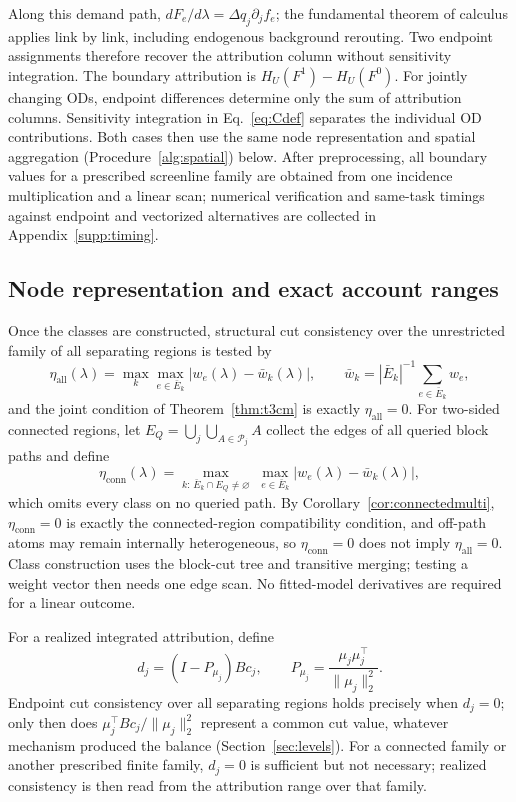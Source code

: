 \documentclass[a4paper,fleqn]{cas-sc}
\newcommand{\norm}[1]{\lVert #1 \rVert}
\begin{document}
Along this demand path, $dF_e/d\lambda=\Delta q_j\partial_jf_e$; the fundamental theorem of calculus applies link by link, including endogenous background rerouting. Two endpoint assignments therefore recover the attribution column without sensitivity integration. The boundary attribution is $H_U(F^1)-H_U(F^0)$.
For jointly changing ODs, endpoint differences determine only the sum of attribution columns. Sensitivity integration in Eq.~\eqref{eq:Cdef} separates the individual OD contributions. Both cases then use the same node representation and spatial aggregation (Procedure~\ref{alg:spatial}) below. After preprocessing, all boundary values for a prescribed screenline family are obtained from one incidence multiplication and a linear scan; numerical verification and same-task timings against endpoint and vectorized alternatives are collected in Appendix~\ref{supp:timing}.
\subsection{Node representation and exact account ranges}
Once the classes are constructed, structural cut consistency over the
unrestricted family of all separating regions is tested by
\begin{equation}
\eta_{\mathrm{all}}(\lambda)=\max_k\max_{e\in\bar E_k}|w_e(\lambda)-\bar w_k(\lambda)|,
\qquad
\bar w_k=|\bar E_k|^{-1}\sum_{e\in\bar E_k}w_e,
\label{eq:etaall}
\end{equation}
and the joint condition of Theorem~\ref{thm:t3cm} is exactly
$\eta_{\mathrm{all}}=0$. For two-sided connected regions, let
$E_Q=\bigcup_j\bigcup_{A\in\mathcal P_j}A$ collect the edges of all queried
block paths and define
\begin{equation}
\eta_{\mathrm{conn}}(\lambda)=
\max_{k:\,\bar E_k\cap E_Q\neq\varnothing}\;
\max_{e\in\bar E_k}|w_e(\lambda)-\bar w_k(\lambda)|,
\label{eq:etaconn}
\end{equation}
which omits every class on no queried path. By
Corollary~\ref{cor:connectedmulti}, $\eta_{\mathrm{conn}}=0$ is exactly the
connected-region compatibility condition, and off-path atoms may remain
internally heterogeneous, so $\eta_{\mathrm{conn}}=0$ does not imply
$\eta_{\mathrm{all}}=0$. Class construction uses the
block-cut tree and transitive merging; testing a weight vector then needs
one edge scan. No fitted-model derivatives are required for a linear outcome.

For a realized integrated attribution, define
\begin{equation}
d_j=(I-P_{\mu_j})Bc_j,\qquad
P_{\mu_j}=\frac{\mu_j\mu_j^\top}{\norm{\mu_j}_2^2}.
\label{eq:endpointd}
\end{equation}
Endpoint cut consistency over all separating regions holds precisely when
$d_j=0$; only then does
$\mu_j^\top Bc_j/\norm{\mu_j}_2^2$ represent a common cut
value, whatever mechanism produced the balance
(Section~\ref{sec:levels}). For a connected family or another prescribed
finite family, $d_j=0$ is sufficient but not necessary; realized
consistency is then read from the attribution range over that family.
\end{document}
